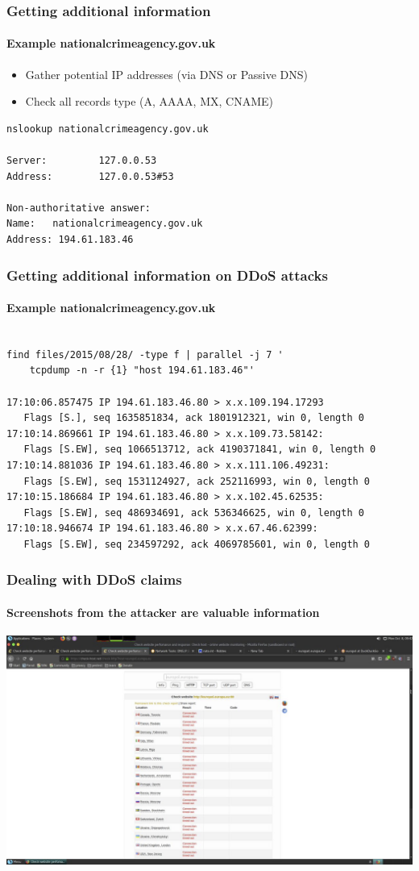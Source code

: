 \documentclass{beamer}
\begin{document}
\begin{frame}[fragile]
\frametitle{Getting additional information}
\framesubtitle{Example nationalcrimeagency.gov.uk}

        \begin{itemize}
                \item Gather potential IP addresses (via DNS or Passive DNS)
                \item Check all records type (A, AAAA, MX, CNAME)
        \end{itemize}
\begin{verbatim}
nslookup nationalcrimeagency.gov.uk

Server:         127.0.0.53
Address:        127.0.0.53#53

Non-authoritative answer:
Name:   nationalcrimeagency.gov.uk
Address: 194.61.183.46
\end{verbatim}
\end{frame}


\begin{frame}[fragile]
\frametitle{Getting additional information on DDoS attacks}
\framesubtitle{Example nationalcrimeagency.gov.uk}
\small
\begin{verbatim}

find files/2015/08/28/ -type f | parallel -j 7 '
    tcpdump -n -r {1} "host 194.61.183.46"'

17:10:06.857475 IP 194.61.183.46.80 > x.x.109.194.17293
   Flags [S.], seq 1635851834, ack 1801912321, win 0, length 0
17:10:14.869661 IP 194.61.183.46.80 > x.x.109.73.58142:
   Flags [S.EW], seq 1066513712, ack 4190371841, win 0, length 0
17:10:14.881036 IP 194.61.183.46.80 > x.x.111.106.49231:
   Flags [S.EW], seq 1531124927, ack 252116993, win 0, length 0
17:10:15.186684 IP 194.61.183.46.80 > x.x.102.45.62535:
   Flags [S.EW], seq 486934691, ack 536346625, win 0, length 0
17:10:18.946674 IP 194.61.183.46.80 > x.x.67.46.62399:
   Flags [S.EW], seq 234597292, ack 4069785601, win 0, length 0
\end{verbatim}
\end{frame}

\begin{frame}
    \frametitle{Dealing with DDoS claims}
    \framesubtitle{Screenshots from the attacker are valuable information}
    \begin{center}
        \includegraphics[scale=0.25]{screenshot.png}
    \end{center}
\end{frame}
\end{document}
